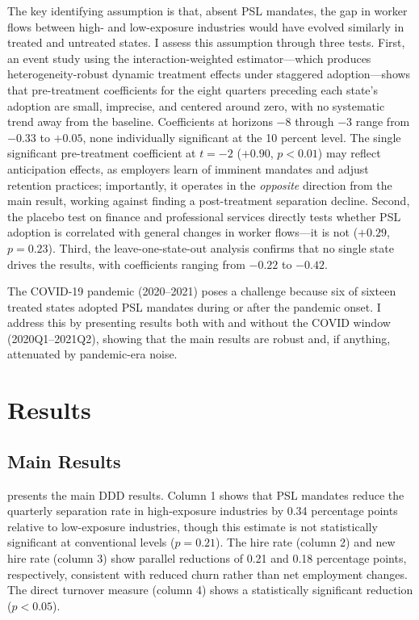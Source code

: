 \documentclass[12pt]{article}
\begin{document}
The key identifying assumption is that, absent PSL mandates, the gap in worker flows between high- and low-exposure industries would have evolved similarly in treated and untreated states. I assess this assumption through three tests. First, an event study using the \citet{sunab2021} interaction-weighted estimator---which produces heterogeneity-robust dynamic treatment effects under staggered adoption---shows that pre-treatment coefficients for the eight quarters preceding each state's adoption are small, imprecise, and centered around zero, with no systematic trend away from the baseline. Coefficients at horizons $-8$ through $-3$ range from $-0.33$ to $+0.05$, none individually significant at the 10 percent level. The single significant pre-treatment coefficient at $t=-2$ ($+0.90$, $p < 0.01$) may reflect anticipation effects, as employers learn of imminent mandates and adjust retention practices; importantly, it operates in the \textit{opposite} direction from the main result, working against finding a post-treatment separation decline. Second, the placebo test on finance and professional services directly tests whether PSL adoption is correlated with general changes in worker flows---it is not ($+0.29$, $p = 0.23$). Third, the leave-one-state-out analysis confirms that no single state drives the results, with coefficients ranging from $-0.22$ to $-0.42$.

The COVID-19 pandemic (2020--2021) poses a challenge because six of sixteen treated states adopted PSL mandates during or after the pandemic onset. I address this by presenting results both with and without the COVID window (2020Q1--2021Q2), showing that the main results are robust and, if anything, attenuated by pandemic-era noise.

\section{Results}

\subsection{Main Results}



 presents the main DDD results. Column 1 shows that PSL mandates reduce the quarterly separation rate in high-exposure industries by 0.34 percentage points relative to low-exposure industries, though this estimate is not statistically significant at conventional levels ($p = 0.21$). The hire rate (column 2) and new hire rate (column 3) show parallel reductions of 0.21 and 0.18 percentage points, respectively, consistent with reduced churn rather than net employment changes. The direct turnover measure (column 4) shows a statistically significant reduction ($p < 0.05$).
\end{document}
